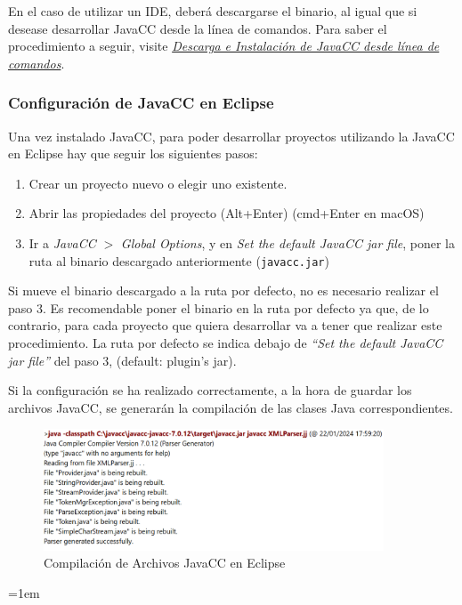 En el caso de utilizar un IDE, deberá descargarse el binario, al igual que si desease desarrollar JavaCC desde la línea de comandos. Para saber el procedimiento a seguir, visite \href{sec:descargaeinstalaciondejavaccdesdelineadecomandos}{\textit{Descarga e Instalación de JavaCC desde línea de comandos}}.

\subsubsection{Configuración de JavaCC en Eclipse}

\noindent Una vez instalado JavaCC, para poder desarrollar proyectos utilizando la JavaCC en Eclipse hay que seguir los siguientes pasos:
\begin{enumerate}
    \item Crear un proyecto nuevo o elegir uno existente.
    \item Abrir las propiedades del proyecto (Alt+Enter) (cmd+Enter en macOS)
    \item  Ir a \textit{JavaCC} $>$ \textit{Global Options}, y en \textit{Set the default JavaCC jar file}, poner la ruta al binario descargado anteriormente (\lstinline|javacc.jar|)
\end{enumerate}

Si mueve el binario descargado a la ruta por defecto, no es necesario realizar el paso 3. Es recomendable poner el binario en la ruta por defecto ya que, de lo contrario, para cada proyecto que quiera desarrollar va a tener que realizar este procedimiento. La ruta por defecto se indica debajo de \textit{“Set the default JavaCC jar file”} del paso 3, (default: plugin’s jar).

Si la configuración se ha realizado correctamente, a la hora de guardar los archivos JavaCC, se generarán la compilación de las clases Java correspondientes.

\begin{figure}[H]
    \centering
    \includegraphics[width=0.9\textwidth]{imagenes/javacccompilation.png}
    \caption{Compilación de Archivos JavaCC en Eclipse}
    \label{fig:javacccompilation}
\end{figure}
\emergencystretch=1em
